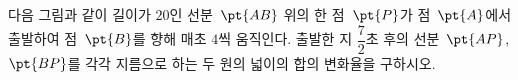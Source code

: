 다음 그림과 같이 길이가 $20$인 선분~$\pt{AB}$ 위의 한 점~$\pt{P}$가 점~$\pt{A}$에서 출발하여 점~$\pt{B}$를 향해 매초 $4$씩 움직인다. 출발한 지 $\dfrac{7}{2}$초 후의 선분~$\pt{AP}$, $\pt{BP}$를 각각 지름으로 하는 두 원의 넓이의 합의 변화율을 구하시오.
\par\smallskip\begin{center}\resizebox{\ifdim\width>\linewidth\linewidth\else\width\fi}{!}{}\end{center}
